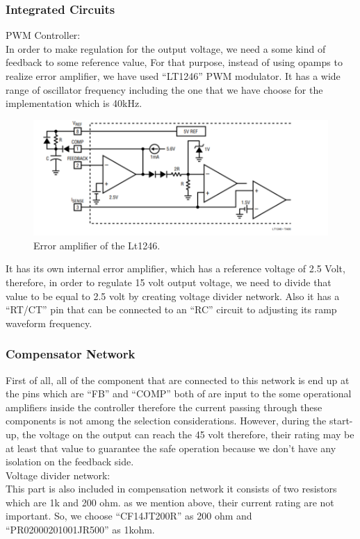 \documentclass{article}
\begin{document}
\subsubsection{Integrated Circuits}
PWM Controller:\\
In order to make regulation for the output voltage, we need a some kind of feedback to some reference value, For that purpose, instead of using opamps to realize error amplifier, we have used “LT1246” PWM modulator. It has a wide range of oscillator frequency including the one that we have choose for the implementation which is 40kHz.
\begin{figure}[H]
    \centering
    \includegraphics{IC.png}
    \caption{Error amplifier of the Lt1246.}
    \label{fig:my_label}
\end{figure}

It has its own internal error amplifier, which has a reference voltage of 2.5 Volt, therefore, in order to regulate 15 volt output voltage, we need to divide that value to be equal to 2.5 volt by creating voltage divider network. Also it has a “RT/CT” pin that can be connected to an “RC” circuit to adjusting its ramp waveform frequency.

\subsubsection{Compensator Network}

First of all, all of the component that are connected to this network is end up at the pins which are “FB” and “COMP” both of are input to the some operational amplifiers inside the controller therefore the current passing through these components is not among the selection considerations. However, during the start-up, the voltage on the output can reach the 45 volt therefore, their rating may be at least that value to guarantee the safe operation because we don’t have any isolation on the feedback side.\\

Voltage divider network:\\ This part is also included in compensation network it consists of two resistors which are 1k and 200 ohm. as we mention above, their current rating are not important. So, we choose “CF14JT200R” as 200 ohm and “PR02000201001JR500” as 1kohm.\\
\end{document}
